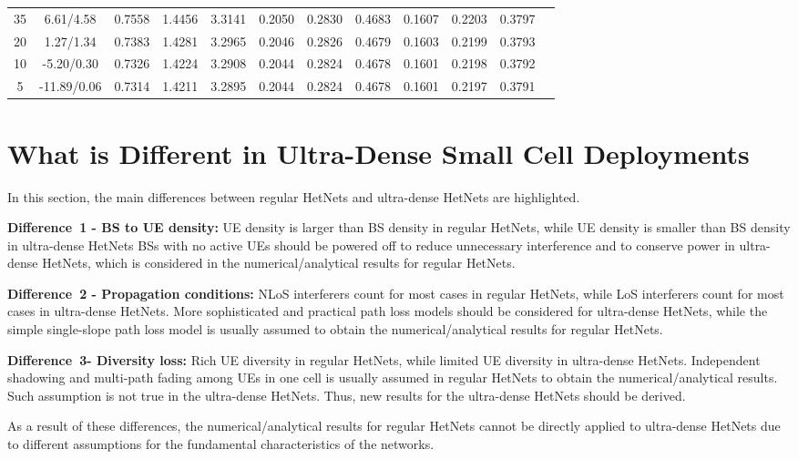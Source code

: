 \documentclass{IEEEtran}
\begin{document}
\begin{table*}
{\begin{tabular}{ c c c c c c c c c c c c }
 35&  6.61/4.58  &  0.7558&1.4456&3.3141  &  0.2050&0.2830&0.4683  &  0.1607&0.2203&0.3797\\

 20&   1.27/1.34 &  0.7383&1.4281&3.2965  &  0.2046&0.2826&0.4679  & 0.1603&0.2199&0.3793\\

 10&  -5.20/0.30  &  0.7326&1.4224&3.2908  & 0.2044&0.2824&0.4678  &  0.1601&0.2198&0.3792\\

  5&  -11.89/0.06  &  0.7314&1.4211&3.2895  & 0.2044&0.2824&0.4678  & 0.1601&0.2197&0.3791\\
\hline
\end{tabular}}
\vspace{-0.1cm}
\end{table*}

\section{What is Different in Ultra-Dense Small Cell Deployments}
\label{sec:Differences}

In this section, the main differences between regular HetNets and  ultra-dense HetNets are highlighted.

{\bf Difference~1 - BS to UE density:}
UE density is larger than  BS density in regular HetNets, 
while UE density is smaller than BS density in ultra-dense HetNets
BSs with no active UEs should be powered off to reduce unnecessary interference and to conserve power in ultra-dense HetNets, 
which is considered in the numerical/analytical results for regular HetNets.

{\bf Difference~2 - Propagation conditions:} 
NLoS interferers count for most cases in regular HetNets, 
while LoS interferers count for most cases in ultra-dense HetNets.
More sophisticated and practical path loss models should be considered for ultra-dense HetNets, 
while the simple single-slope path loss model is usually assumed to obtain the numerical/analytical results for regular HetNets.

{\bf Difference~3- Diversity loss:} 
Rich UE diversity in regular HetNets, 
while limited UE diversity in ultra-dense HetNets.
Independent shadowing and multi-path fading among UEs in one cell is usually assumed in regular HetNets to obtain the numerical/analytical results. 
Such assumption is not true in the ultra-dense HetNets. Thus, new results for the ultra-dense HetNets should be derived. 

As a result of these differences, the numerical/analytical results for regular HetNets cannot be directly applied to ultra-dense HetNets due to different assumptions for the fundamental characteristics of the networks. 
\end{document}
